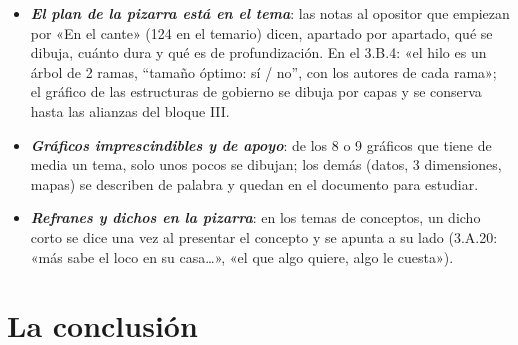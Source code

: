 \documentclass[11pt]{article}
\begin{document}
\begin{itemize}
\item \textbf{\emph{El plan de la pizarra está en el tema}}: las notas al opositor que empiezan por «En el cante» (124 en el temario) dicen, apartado por apartado, qué se dibuja, cuánto dura y qué es de profundización. En el 3.B.4: «el hilo es un árbol de 2 ramas, “tamaño óptimo: sí / no”, con los autores de cada rama»; el gráfico de las estructuras de gobierno se dibuja por capas y se conserva hasta las alianzas del bloque III.
\item \textbf{\emph{Gráficos imprescindibles y de apoyo}}: de los 8 o 9 gráficos que tiene de media un tema, solo unos pocos se dibujan; los demás (datos, 3 dimensiones, mapas) se describen de palabra y quedan en el documento para estudiar.
\item \textbf{\emph{Refranes y dichos en la pizarra}}: en los temas de conceptos, un dicho corto se dice una vez al presentar el concepto y se apunta a su lado (3.A.20: «más sabe el loco en su casa…», «el que algo quiere, algo le cuesta»).
\end{itemize}

\section{La conclusión}\label{sec:conclusion}
\end{document}
